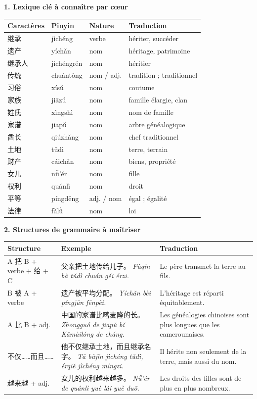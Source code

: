 \documentclass[11pt]{article}
\begin{document}
\begin{bilan}
\textbf{1. Lexique clé à connaître par cœur}
\begin{center}
\begin{tabularx}{\linewidth}{|X|X|X|X|}
\hline
\rowcolor{popblueL} Caractères & Pinyin & Nature & Traduction \\
\hline
继承 & jìchéng & verbe & hériter, succéder \\
\hline
遗产 & yíchǎn & nom & héritage, patrimoine \\
\hline
继承人 & jìchéngrén & nom & héritier \\
\hline
传统 & chuántǒng & nom / adj. & tradition ; traditionnel \\
\hline
习俗 & xísú & nom & coutume \\
\hline
家族 & jiāzú & nom & famille élargie, clan \\
\hline
姓氏 & xìngshì & nom & nom de famille \\
\hline
家谱 & jiāpǔ & nom & arbre généalogique \\
\hline
酋长 & qiúzhǎng & nom & chef traditionnel \\
\hline
土地 & tǔdì & nom & terre, terrain \\
\hline
财产 & cáichǎn & nom & biens, propriété \\
\hline
女儿 & nǚ'ér & nom & fille \\
\hline
权利 & quánlì & nom & droit \\
\hline
平等 & píngděng & adj. / nom & égal ; égalité \\
\hline
法律 & fǎlǜ & nom & loi \\
\hline
\end{tabularx}
\end{center}

\textbf{2. Structures de grammaire à maîtriser}
\begin{center}
\begin{tabularx}{\linewidth}{|X|X|X|}
\hline
\rowcolor{popblueL} Structure & Exemple & Traduction \\
\hline
A 把 B + verbe + 给 + C & 父亲把土地传给儿子。 \emph{Fùqin bǎ tǔdì chuán gěi érzi.} & Le père transmet la terre au fils. \\
\hline
B 被 A + verbe & 遗产被平均分配。 \emph{Yíchǎn bèi píngjūn fēnpèi.} & L'héritage est réparti équitablement. \\
\hline
A 比 B + adj. & 中国的家谱比喀麦隆的长。 \emph{Zhōngguó de jiāpǔ bǐ Kāmàilóng de cháng.} & Les généalogies chinoises sont plus longues que les camerounaises. \\
\hline
不仅……而且…… & 他不仅继承土地，而且继承名字。 \emph{Tā bùjǐn jìchéng tǔdì, érqiě jìchéng míngzi.} & Il hérite non seulement de la terre, mais aussi du nom. \\
\hline
越来越 + adj. & 女儿的权利越来越多。 \emph{Nǚ'ér de quánlì yuè lái yuè duō.} & Les droits des filles sont de plus en plus nombreux. \\
\hline
\end{tabularx}
\end{center}


\end{bilan}
\end{document}
